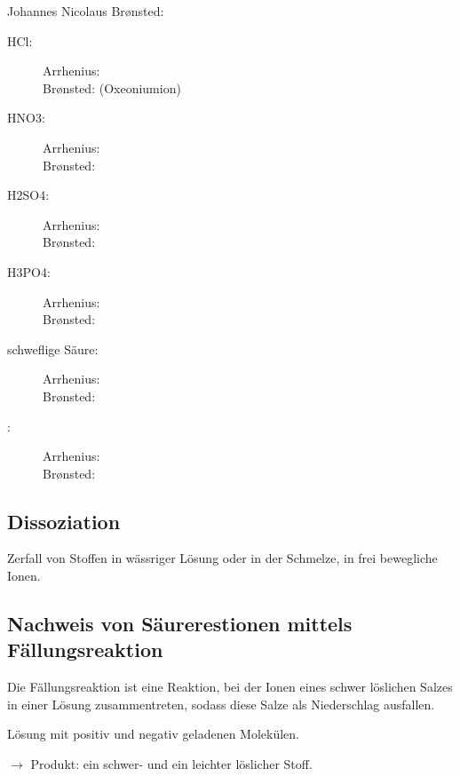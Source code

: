 Johannes Nicolaus Brønsted: 
\vspace{0.3cm}
\begin{description}
   \item[\acl{HCl}:] Arrhenius:  \\
   Brønsted:  (Oxeoniumion)
   \item[\acl{HNO3}:] Arrhenius:  \\
   Brønsted: 
   \item[\acl{H2SO4}:] Arrhenius:  \\
   Brønsted: 
   \item[\acl{H3PO4}:] Arrhenius:  \\
   Brønsted: 
   \item[schweflige Säure:] Arrhenius:  \\
   Brønsted: 
   \item[:] Arrhenius:  \\
   Brønsted: 
\end{description}

\subsection{Dissoziation}
Zerfall von Stoffen in wässriger Lösung oder in der Schmelze, in frei bewegliche Ionen.


\subsection{Nachweis von Säurerestionen mittels Fällungsreaktion}
Die Fällungsreaktion ist eine Reaktion, bei der Ionen eines schwer löslichen Salzes in einer Lösung
zusammentreten, sodass diese Salze als Niederschlag ausfallen.

Lösung mit positiv und negativ geladenen Molekülen.

$\rightarrow$ Produkt: ein schwer- und ein leichter löslicher Stoff.

